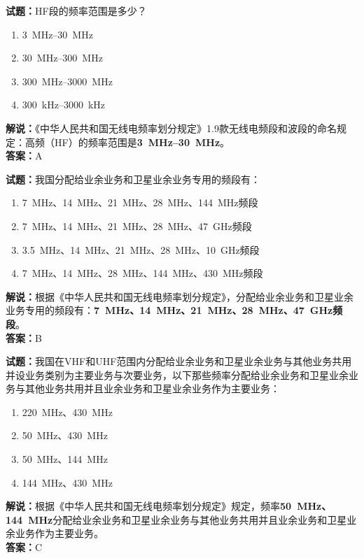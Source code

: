 \documentclass{ctexbook}
\begin{document}
\vspace{\baselineskip}

\noindent\textbf{试题：}HF段的频率范围是多少？
\begin{enumerate}[leftmargin=3em]
  \item \qtyrange[range-phrase=\mbox{到}]{3}{30}{\MHz}
  \item \qtyrange[range-phrase=\mbox{到}]{30}{300}{\MHz}
  \item \qtyrange[range-phrase=\mbox{到}]{300}{3000}{\MHz}%
  \item \qtyrange[range-phrase=\mbox{到}]{300}{3000}{\kHz}%
\end{enumerate}
\noindent\textbf{解说：}《中华人民共和国无线电频率划分规定》1.9款无线电频段和波段的命名规定：高频（HF）的频率范围是\textbf{\qtyrange[range-phrase=\mbox{到}]{3}{30}{\MHz}}。\\\noindent\textbf{答案：}A

\vspace{\baselineskip}

\noindent\textbf{试题：}我国分配给业余业务和卫星业余业务专用的频段有：
\begin{enumerate}[leftmargin=3em]
  \item \qty{7}{\MHz}、\qty{14}{\MHz}、\qty{21}{\MHz}、\qty{28}{\MHz}、\qty{144}{\MHz}频段
  \item \qty{7}{\MHz}、\qty{14}{\MHz}、\qty{21}{\MHz}、\qty{28}{\MHz}、\qty{47}{\GHz}频段
  \item \qty{3.5}{\MHz}、\qty{14}{\MHz}、\qty{21}{\MHz}、\qty{28}{\MHz}、\qty{10}{\GHz}频段
  \item \qty{7}{\MHz}、\qty{14}{\MHz}、\qty{28}{\MHz}、\qty{144}{\MHz}、\qty{430}{\MHz}频段
\end{enumerate}
\noindent\textbf{解说：}根据《中华人民共和国无线电频率划分规定》，分配给业余业务和卫星业余业务专用的频段有：\textbf{\qty{7}{\MHz}、\qty{14}{\MHz}、\qty{21}{\MHz}、\qty{28}{\MHz}、\qty{47}{\GHz}频段}。\\\noindent\textbf{答案：}B

\vspace{\baselineskip}

\noindent\textbf{试题：}我国在VHF和UHF范围内分配给业余业务和卫星业余业务与其他业务共用并设业务类别为主要业务与次要业务，以下那些频率分配给业余业务和卫星业余业务与其他业务共用并且业余业务和卫星业余业务作为主要业务：
\begin{enumerate}[leftmargin=3em]
  \item \qty{220}{\MHz}、\qty{430}{\MHz}
  \item \qty{50}{\MHz}、\qty{430}{\MHz}
  \item \qty{50}{\MHz}、\qty{144}{\MHz}
  \item \qty{144}{\MHz}、\qty{430}{\MHz}
\end{enumerate}
\noindent\textbf{解说：}根据《中华人民共和国无线电频率划分规定》规定，频率\textbf{\qty{50}{\MHz}、\qty{144}{\MHz}}分配给业余业务和卫星业余业务与其他业务共用并且业余业务和卫星业余业务作为主要业务。\\\noindent\textbf{答案：}C
\end{document}
